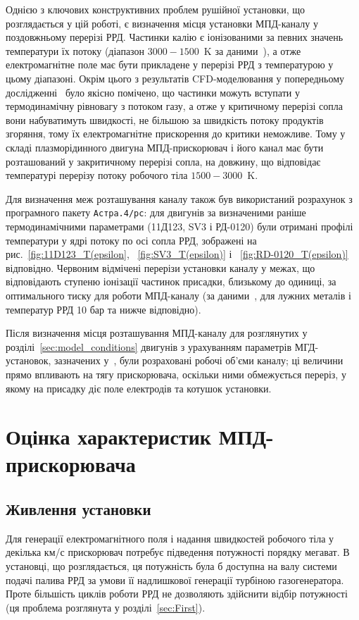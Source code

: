 Однією з ключових конструктивних проблем рушійної установки, що розглядається у цій роботі, є визначення місця установки МПД-каналу у поздовжньому перерізі РРД. Частинки калію є іонізованими за певних значень температури їх потоку (діапазон $3000 - 1500$~K за даними~\cite{Panchenko}), а отже електромагнітне поле має бути прикладене у перерізі РРД з температурою у цьому діапазоні. Окрім цього з результатів CFD-моделювання у попередньому дослідженні~\cite{Previous} було якісно помічено, що частинки можуть вступати у термодинамічну рівновагу з потоком газу, а отже у критичному перерізі сопла вони набуватимуть швидкості, не більшою за швидкість потоку продуктів згоряння, тому їх електромагнітне прискорення до критики неможливе. Тому у складі плазморідинного двигуна МПД-прискорювач і його канал має бути розташований у закритичному перерізі сопла, на довжину, що відповідає температурі перерізу потоку робочого тіла $1500-3000$~K.

Для визначення меж розташування каналу також був використаний розрахунок з програмного пакету \texttt{Астра.4/рс}: для двигунів за визначеними раніше термодинамічними параметрами (11Д123, SV3 і РД-0120) були отримані профілі температури у ядрі потоку по осі сопла РРД, зображені на рис.~\ref{fig:11D123_T(epsilon}, ~\ref{fig:SV3_T(epsilon)} і ~\ref{fig:RD-0120_T(epsilon)} відповідно. Червоним відмічені перерізи установки каналу у межах, що відповідають ступеню іонізації частинок присадки, близькому до одиниці, за оптимального тиску для роботи МПД-каналу (за даними~\cite{Panchenko}, для лужних металів і температур РРД 10 бар та нижче відповідно).

Після визначення місця розташування МПД-каналу для розглянутих у розділі~\ref{sec:model_conditions} двигунів з урахуванням параметрів МГД-установок, зазначених у~\cite{MHDG}, були розраховані робочі об'єми каналу; ці величини прямо впливають на тягу прискорювача, оскільки ними обмежується переріз, у якому на присадку діє поле електродів та котушок установки.


\section{Оцінка характеристик МПД-прискорювача}

\subsection{Живлення установки\label{sec:power_supply}}

Для генерації електромагнітного поля і надання швидкостей робочого тіла у декілька км/с прискорювач потребує підведення потужності порядку мегават. В установці, що розглядається, ця потужність була б доступна на валу системи подачі палива РРД за умови її надлишкової генерації турбіною газогенератора. Проте більшість циклів роботи РРД не дозволяють здійснити відбір потужності (ця проблема розглянута у розділі~\ref{sec:First}).


